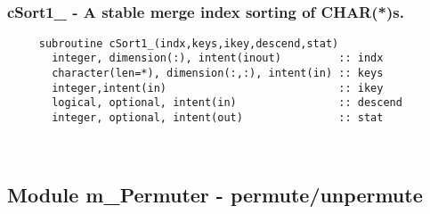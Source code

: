  
\mbox{}\hrulefill\ 
 
  \subsubsection{cSort1\_ - A stable merge index sorting of CHAR(*)s.}

\begin{verbatim} 
     subroutine cSort1_(indx,keys,ikey,descend,stat)
       integer, dimension(:), intent(inout)         :: indx
       character(len=*), dimension(:,:), intent(in) :: keys
       integer,intent(in)                           :: ikey
       logical, optional, intent(in)                :: descend
       integer, optional, intent(out)               :: stat
 \end{verbatim}%


 
 
\mbox{}\hrulefill\ 
 
  \subsection{Module m\_Permuter - permute/unpermute }

